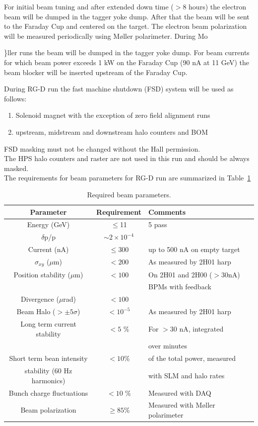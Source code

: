 \documentclass[11pt]{article}
\begin{document}
For initial beam tuning and after extended down time ($>$8 hours) the electron beam will be dumped in the tagger yoke dump. After that the beam will be sent to the Faraday Cup and centered on the target.  The electron beam polarization will be measured periodically using M{\o}ller polarimeter. During Mo{\}ller runs the beam will be dumped in the tagger yoke dump. For beam currents for which beam power exceeds 1 kW on the Faraday Cup (90 nA at 11 GeV) the beam blocker will be inserted upstream of the Faraday Cup.


During RG-D run the fast machine shutdown (FSD) system will be used as follows:
\begin{enumerate}
\item Solenoid magnet with the exception of zero field alignment runs
\item upstream, midstream and downstream halo counters and BOM
\end{enumerate}

FSD masking must not be changed without the Hall permission.\\
The HPS halo counters and raster are not used in this run and should be always masked.\\

The requirements for beam parameters for RG-D run are summarized in Table~\ref{tab:beam_par}

 \begin{table}[htb]
\caption{Required beam parameters.}\label{tab:beam_par}
\centering
 \begin{tabular}{|c|c|l|}
\hline
Parameter & Requirement &Comments \\ \hline 
Energy (GeV) & $\leq$11   & 5 pass  \\  \hline
$\delta$p/p & $\sim 2\times 10^{-4}$ & \\ \hline 
Current (nA) & $\le 300$ &up to 500 nA on empty target  \\  \hline
$\sigma_{xy}$ ($\mu$m) &$ < 200$& As measured by 2H01 harp \\ \hline 
Position stability ($\mu$m) & $< 100$ & On 2H01 and 2H00 ($>30$nA) \\ 
&&BPMs with feedback \\ \hline
Divergence ($\mu$rad) & $< 100$&  \\ \hline 
Beam Halo ($> \pm 5\sigma$) &$< 10^{-5}$&As measured by 2H01 harp \\ \hline
Long term current stability & $< 5$ \% & For $>30$ nA, integrated \\
&&over minutes \\ \hline 
Short term bean intensity & $<10$\%& of the total power, measured \\stability (60 Hz harmonics) && with SLM and halo rates \\ \hline
Bunch charge fluctuations &$< 10$ \% & Measured with DAQ \\ \hline
Beam polarization & $\geq 85\%$&Measured with M{\o}ller polarimeter\\ \hline
 \end{tabular}
\end{table}

}
\end{document}
